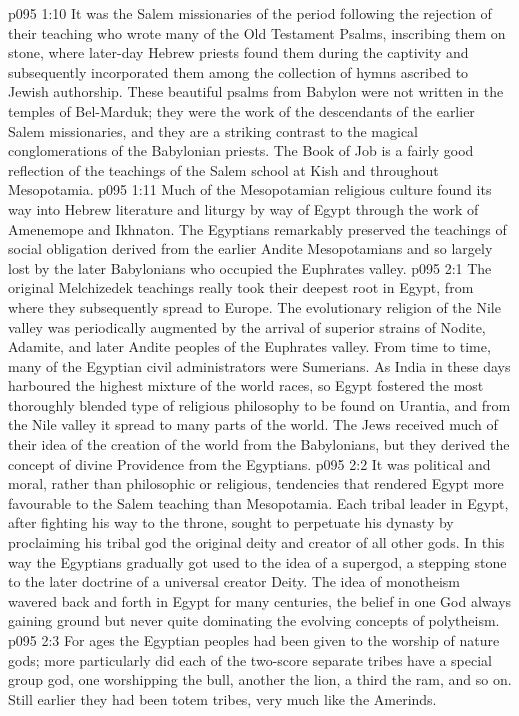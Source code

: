 \vs p095 1:10 \pc It was the Salem missionaries of the period following the rejection of their teaching who wrote many of the Old Testament Psalms, inscribing them on stone, where later\hyp{}day Hebrew priests found them during the captivity and subsequently incorporated them among the collection of hymns ascribed to Jewish authorship. These beautiful psalms from Babylon were not written in the temples of Bel\hyp{}Marduk; they were the work of the descendants of the earlier Salem missionaries, and they are a striking contrast to the magical conglomerations of the Babylonian priests. The Book of Job is a fairly good reflection of the teachings of the Salem school at Kish and throughout Mesopotamia.
\vs p095 1:11 Much of the Mesopotamian religious culture found its way into Hebrew literature and liturgy by way of Egypt through the work of Amenemope and Ikhnaton. The Egyptians remarkably preserved the teachings of social obligation derived from the earlier Andite Mesopotamians and so largely lost by the later Babylonians who occupied the Euphrates valley.
\vs p095 2:1 The original Melchizedek teachings really took their deepest root in Egypt, from where they subsequently spread to Europe. The evolutionary religion of the Nile valley was periodically augmented by the arrival of superior strains of Nodite, Adamite, and later Andite peoples of the Euphrates valley. From time to time, many of the Egyptian civil administrators were Sumerians. As India in these days harboured the highest mixture of the world races, so Egypt fostered the most thoroughly blended type of religious philosophy to be found on Urantia, and from the Nile valley it spread to many parts of the world. The Jews received much of their idea of the creation of the world from the Babylonians, but they derived the concept of divine Providence from the Egyptians.
\vs p095 2:2 It was political and moral, rather than philosophic or religious, tendencies that rendered Egypt more favourable to the Salem teaching than Mesopotamia. Each tribal leader in Egypt, after fighting his way to the throne, sought to perpetuate his dynasty by proclaiming his tribal god the original deity and creator of all other gods. In this way the Egyptians gradually got used to the idea of a supergod, a stepping stone to the later doctrine of a universal creator Deity. The idea of monotheism wavered back and forth in Egypt for many centuries, the belief in one God always gaining ground but never quite dominating the evolving concepts of polytheism.
\vs p095 2:3 For ages the Egyptian peoples had been given to the worship of nature gods; more particularly did each of the two\hyp{}score separate tribes have a special group god, one worshipping the bull, another the lion, a third the ram, and so on. Still earlier they had been totem tribes, very much like the Amerinds.

